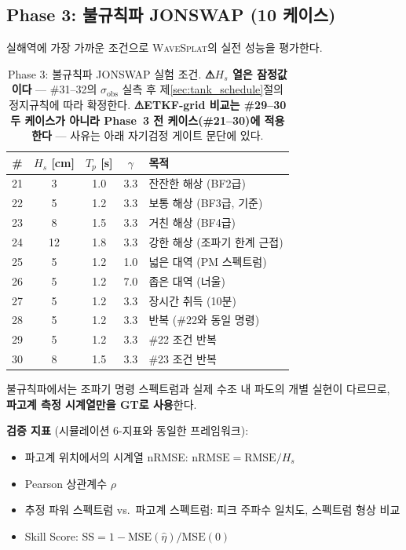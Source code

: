 \documentclass[11pt]{report}
\numberwithin{equation}{chapter}
\numberwithin{figure}{chapter}
\numberwithin{table}{chapter}
\newcommand{\WS}{\textsc{WaveSplat}}
\begin{document}
\subsection{Phase 3: 불규칙파 JONSWAP (10 케이스)}
\label{sec:tank_phase3}

실해역에 가장 가까운 조건으로 \WS{}의 실전 성능을 평가한다.

\begin{table}[H]
\centering
\caption{Phase 3: 불규칙파 JONSWAP 실험 조건.
  \textbf{⚠$H_s$ 열은 잠정값이다} --- \#31--32의 $\sigma_{\text{obs}}$ 실측 후
  제\ref{sec:tank_schedule}절의 정지규칙에 따라 확정한다.
  \textbf{⚠ETKF-grid 비교는 \#29--30 두 케이스가 아니라
  Phase~3 전 케이스(\#21--30)에 적용한다} --- 사유는 아래 자기검정 게이트 문단에 있다.}
\label{tab:tank_phase3}
\begin{tabular}{ccccl}
\toprule
\# & $H_s$ [cm] & $T_p$ [s] & $\gamma$ & 목적 \\
\midrule
21 & 3 & 1.0 & 3.3 & 잔잔한 해상 (BF2급) \\
22 & 5 & 1.2 & 3.3 & 보통 해상 (BF3급, 기준) \\
23 & 8 & 1.5 & 3.3 & 거친 해상 (BF4급) \\
24 & 12 & 1.8 & 3.3 & 강한 해상 (조파기 한계 근접) \\
25 & 5 & 1.2 & 1.0 & 넓은 대역 (PM 스펙트럼) \\
26 & 5 & 1.2 & 7.0 & 좁은 대역 (너울) \\
\midrule
27 & 5 & 1.2 & 3.3 & 장시간 취득 (10분) \\
28 & 5 & 1.2 & 3.3 & 반복 (\#22와 동일 명령) \\
29 & 5 & 1.2 & 3.3 & \#22 조건 반복 \\
30 & 8 & 1.5 & 3.3 & \#23 조건 반복 \\
\bottomrule
\end{tabular}
\end{table}

불규칙파에서는 조파기 명령 스펙트럼과 실제 수조 내 파도의 개별 실현이 다르므로,
\textbf{파고계 측정 시계열만을 GT로 사용}한다.

\textbf{검증 지표} (시뮬레이션 6-지표와 동일한 프레임워크):
\begin{itemize}
  \item 파고계 위치에서의 시계열 nRMSE: $\text{nRMSE} = \text{RMSE}/H_s$
  \item Pearson 상관계수 $\rho$
  \item 추정 파워 스펙트럼 vs.\ 파고계 스펙트럼: 피크 주파수 일치도, 스펙트럼 형상 비교
  \item Skill Score: $\text{SS} = 1 - \text{MSE}(\hat{\eta})/\text{MSE}(0)$
\end{itemize}
\end{document}
